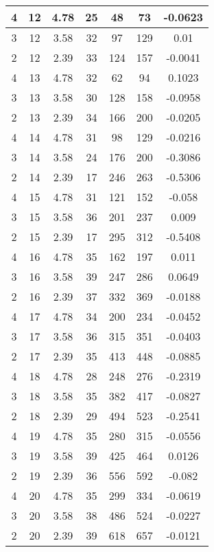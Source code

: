 \documentclass[letterpaper, 12pt]{article}
\begin{document}
\begin{longtable}{|c|c|c|c|c|c|c|}
\hline
4 & 12 & 4.78 & 25 & 48 & 73 & -0.0623 \\
\hline
3 & 12 & 3.58 & 32 & 97 & 129 & 0.01 \\
\hline
2 & 12 & 2.39 & 33 & 124 & 157 & -0.0041 \\
\hline
4 & 13 & 4.78 & 32 & 62 & 94 & 0.1023 \\
\hline
3 & 13 & 3.58 & 30 & 128 & 158 & -0.0958 \\
\hline
2 & 13 & 2.39 & 34 & 166 & 200 & -0.0205 \\
\hline
4 & 14 & 4.78 & 31 & 98 & 129 & -0.0216 \\
\hline
3 & 14 & 3.58 & 24 & 176 & 200 & -0.3086 \\
\hline
2 & 14 & 2.39 & 17 & 246 & 263 & -0.5306 \\
\hline
4 & 15 & 4.78 & 31 & 121 & 152 & -0.058 \\
\hline
3 & 15 & 3.58 & 36 & 201 & 237 & 0.009 \\
\hline
2 & 15 & 2.39 & 17 & 295 & 312 & -0.5408 \\
\hline
4 & 16 & 4.78 & 35 & 162 & 197 & 0.011 \\
\hline
3 & 16 & 3.58 & 39 & 247 & 286 & 0.0649 \\
\hline
2 & 16 & 2.39 & 37 & 332 & 369 & -0.0188 \\
\hline
4 & 17 & 4.78 & 34 & 200 & 234 & -0.0452 \\
\hline
3 & 17 & 3.58 & 36 & 315 & 351 & -0.0403 \\
\hline
2 & 17 & 2.39 & 35 & 413 & 448 & -0.0885 \\
\hline
4 & 18 & 4.78 & 28 & 248 & 276 & -0.2319 \\
\hline
3 & 18 & 3.58 & 35 & 382 & 417 & -0.0827 \\
\hline
2 & 18 & 2.39 & 29 & 494 & 523 & -0.2541 \\
\hline
4 & 19 & 4.78 & 35 & 280 & 315 & -0.0556 \\
\hline
3 & 19 & 3.58 & 39 & 425 & 464 & 0.0126 \\
\hline
2 & 19 & 2.39 & 36 & 556 & 592 & -0.082 \\
\hline
4 & 20 & 4.78 & 35 & 299 & 334 & -0.0619 \\
\hline
3 & 20 & 3.58 & 38 & 486 & 524 & -0.0227 \\
\hline
2 & 20 & 2.39 & 39 & 618 & 657 & -0.0121 \\
\hline
\end{longtable}
\end{document}
